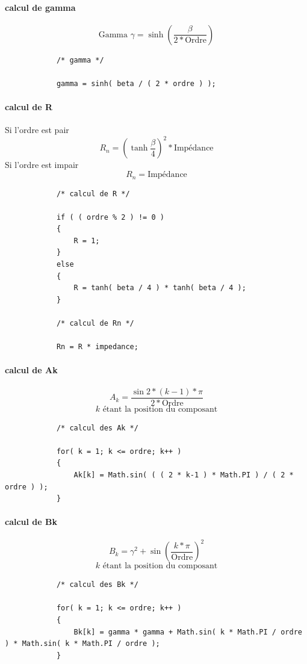\documentclass[a4paper,11pt]{article}
\begin{document}
        \paragraph{calcul de gamma}
        \[ \mbox{Gamma } \gamma = \sinh( \frac{ \beta }{ 2 * \mbox{Ordre} } ) \]
        \begin{lstlisting}
            /* gamma */

            gamma = sinh( beta / ( 2 * ordre ) );

        \end{lstlisting}

    \clearpage

        \paragraph{calcul de R}
        Si l'ordre est pair \[ R_{n} = ( \tanh{ \frac{ \beta }{ 4 } } ) ^2 * \mbox{Impédance} \]
        Si l'ordre est impair \[ R_{n} = \mbox{Impédance} \]
        \begin{lstlisting}
            /* calcul de R */

            if ( ( ordre % 2 ) != 0 )
            {
                R = 1;
            }
            else
            {
                R = tanh( beta / 4 ) * tanh( beta / 4 );
            }

            /* calcul de Rn */

            Rn = R * impedance;

        \end{lstlisting}

        \paragraph{calcul de Ak}
        \[ A_{k} = \frac{\sin{2 * (k-1) * \pi}}{2 * \mbox{Ordre}} \]
        \[ k \mbox{ étant la position du composant} \]
        \begin{lstlisting}
            /* calcul des Ak */

            for( k = 1; k <= ordre; k++ )
            {
                Ak[k] = Math.sin( ( ( 2 * k-1 ) * Math.PI ) / ( 2 * ordre ) );
            }

        \end{lstlisting}

    \clearpage

        \paragraph{calcul de Bk}
        \[ B_{k} = \gamma ^2 + \sin( \frac{k * \pi}{\mbox{Ordre}} ) ^2 \]
        \[ k \mbox{ étant la position du composant} \]
        \begin{lstlisting}
            /* calcul des Bk */

            for( k = 1; k <= ordre; k++ )
            {
                Bk[k] = gamma * gamma + Math.sin( k * Math.PI / ordre ) * Math.sin( k * Math.PI / ordre );
            }

        \end{lstlisting}
\end{document}
